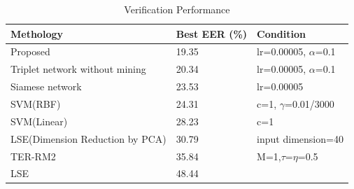 \documentclass[runningheads]{llncs}
\begin{document}
\begin{table}[]
    \caption{Verification Performance}\label{tab3}
    \centering
    \begin{tabular}{|l|l|l|}
    \hline
    Methology   &   Best EER (\%) &   Condition   \\  \hline
    Proposed &   19.35   &   lr=0.00005, $\alpha$=0.1  \\
    Triplet network without mining    &   20.34   &   lr=0.00005, $\alpha$=0.1  \\
    Siamese network  &   23.53   &   lr=0.00005  \\
    SVM(RBF)    &   24.31   &   c=1, $\gamma$=0.01/3000 \\
    SVM(Linear) &   28.23   &   c=1 \\
    LSE(Dimension Reduction by PCA)    &   30.79   &  input dimension=40    \\
    TER-RM2 &   35.84   &  M=1,$\tau$=$\eta$=0.5   \\
    LSE &   48.44   &   \\  \hline
    \end{tabular}
\end{table}
\end{document}
